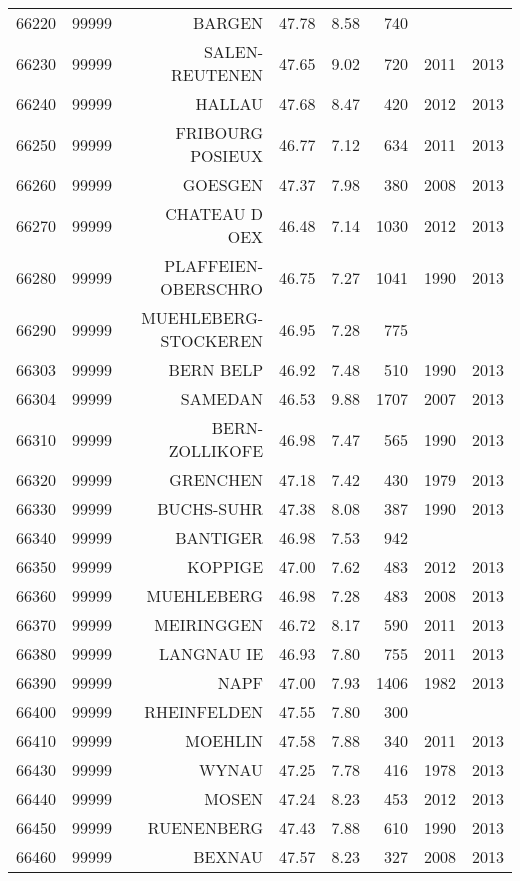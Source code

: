 \begin{longtable}{rrrrrrrr}
  66220 & 99999 & BARGEN & 47.78 & 8.58 & 740 &  &  \\ 
  66230 & 99999 & SALEN-REUTENEN & 47.65 & 9.02 & 720 & 2011 & 2013 \\ 
  66240 & 99999 & HALLAU & 47.68 & 8.47 & 420 & 2012 & 2013 \\ 
  66250 & 99999 & FRIBOURG POSIEUX & 46.77 & 7.12 & 634 & 2011 & 2013 \\ 
  66260 & 99999 & GOESGEN & 47.37 & 7.98 & 380 & 2008 & 2013 \\ 
  66270 & 99999 & CHATEAU D OEX & 46.48 & 7.14 & 1030 & 2012 & 2013 \\ 
  66280 & 99999 & PLAFFEIEN-OBERSCHRO & 46.75 & 7.27 & 1041 & 1990 & 2013 \\ 
  66290 & 99999 & MUEHLEBERG-STOCKEREN & 46.95 & 7.28 & 775 &  &  \\ 
  66303 & 99999 & BERN BELP & 46.92 & 7.48 & 510 & 1990 & 2013 \\ 
  66304 & 99999 & SAMEDAN & 46.53 & 9.88 & 1707 & 2007 & 2013 \\ 
  66310 & 99999 & BERN-ZOLLIKOFE & 46.98 & 7.47 & 565 & 1990 & 2013 \\ 
  66320 & 99999 & GRENCHEN & 47.18 & 7.42 & 430 & 1979 & 2013 \\ 
  66330 & 99999 & BUCHS-SUHR & 47.38 & 8.08 & 387 & 1990 & 2013 \\ 
  66340 & 99999 & BANTIGER & 46.98 & 7.53 & 942 &  &  \\ 
  66350 & 99999 & KOPPIGE & 47.00 & 7.62 & 483 & 2012 & 2013 \\ 
  66360 & 99999 & MUEHLEBERG & 46.98 & 7.28 & 483 & 2008 & 2013 \\ 
  66370 & 99999 & MEIRINGGEN & 46.72 & 8.17 & 590 & 2011 & 2013 \\ 
  66380 & 99999 & LANGNAU IE & 46.93 & 7.80 & 755 & 2011 & 2013 \\ 
  66390 & 99999 & NAPF & 47.00 & 7.93 & 1406 & 1982 & 2013 \\ 
  66400 & 99999 & RHEINFELDEN & 47.55 & 7.80 & 300 &  &  \\ 
  66410 & 99999 & MOEHLIN & 47.58 & 7.88 & 340 & 2011 & 2013 \\ 
  66430 & 99999 & WYNAU & 47.25 & 7.78 & 416 & 1978 & 2013 \\ 
  66440 & 99999 & MOSEN & 47.24 & 8.23 & 453 & 2012 & 2013 \\ 
  66450 & 99999 & RUENENBERG & 47.43 & 7.88 & 610 & 1990 & 2013 \\ 
  66460 & 99999 & BEXNAU & 47.57 & 8.23 & 327 & 2008 & 2013 \\ 

\end{longtable}
